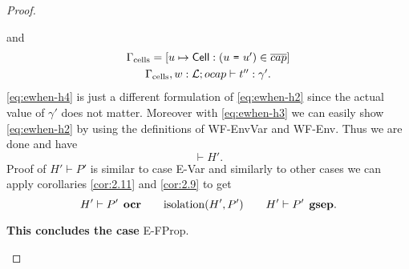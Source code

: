 \begin{proof}
\begin{description}
\begin{description}
\begin{description}
              and
              \begin{equation} \label{eq:ewhen-h4}
                \begin{gathered}
                  \Gamma_{\text{cells}} = [u \mapsto \mbox{$\mathsf{Cell}$}: (\mbox{\mdseries$u$~\texttt{=}~$u'$}) \in
                  \overline{cap}] \\
                  \mbox{$\Gamma_{\text{cells}}, w:
                  \mbox{$\mathcal{L}$};\mbox{$ocap$}\vdash t'':\gamma'$}.
                \end{gathered}
              \end{equation}
              \eqref{eq:ewhen-h4} is just a different formulation of
              \eqref{eq:ewhen-h2} since the actual value of $\gamma'$ does not
              matter. Moreover with \eqref{eq:ewhen-h3} we can easily show
              \eqref{eq:ewhen-h2} by using the definitions of {\sc WF-EnvVar}
              and {\sc WF-Env}. Thus we are done and have
              \begin{equation}
                \vdash H'.
              \end{equation}
              Proof of $H' \vdash P'$ is similar to case {\sc E-Var} and
              similarly to other cases we can apply corollaries \ref{cor:2.11}
              and \ref{cor:2.9} to get
              \begin{equation}
                H' \vdash P' \:\: \mbox{\bf ocr} \quad\quad \mbox{$\mathrm{isolation}$}(H', P') \quad\quad H'
                \vdash P' \:\: \mbox{\bf gsep}.
              \end{equation}

              {\bf This concludes the case} {\sc E-FProp}.
          \end{description}


\end{description}
\end{description}
\end{proof}

